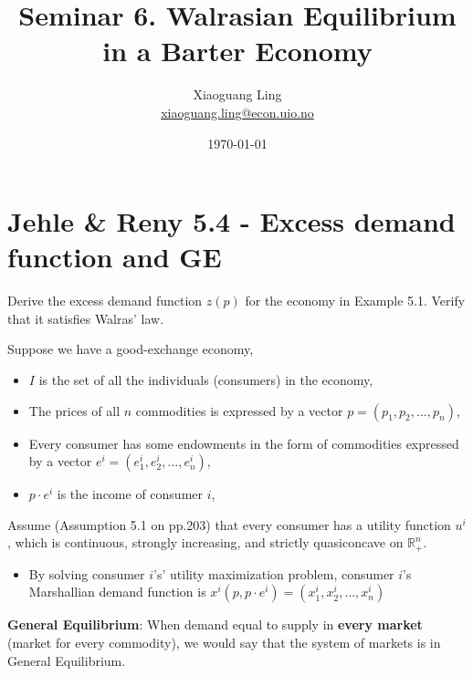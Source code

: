 \documentclass{article}
\title{Seminar 6. Walrasian Equilibrium in a Barter Economy}
\author{Xiaoguang Ling \\  \href{xiaoguang.ling@econ.uio.no}{xiaoguang.ling@econ.uio.no}}
\date{\today}
\newcommand{\R}{\mathbb{R}}
\begin{document}
\maketitle



\section{Jehle \& Reny 5.4 - Excess demand function and GE}

Derive the excess demand function $z(p)$ for the economy in Example 5.1. Verify that it satisfies
Walras' law.

\begin{mdframed}[backgroundcolor=blue!20,linecolor=white]

Suppose we have a good-exchange economy,

\begin{itemize}
\item $I$ is the set of all the individuals (consumers) in the economy,
\item The prices of all $n$ commodities is expressed by a vector $p = (p_1, p_2, \dots, p_n)$,
\item Every consumer has some endowments in the form of commodities expressed by a vector $e^i = (e^i_1,e^i_2,\dots,e^i_n)$,
\item $p\cdot e^i$ is the income of consumer $i$,
\end{itemize}

Assume (Assumption 5.1 on pp.203) that every consumer has a utility function $u^i$, which is continuous, strongly increasing, and strictly quasiconcave on $\R^n_{+}$.

\begin{itemize}
\item By solving consumer $i$'s' utility maximization problem, consumer $i$'s Marshallian demand function is $x^i(p,p\cdot e^i) = (x^i_1,x^i_2,\dots,x^i_n)$
\end{itemize}

\textbf{General Equilibrium}: When demand equal to supply in \textbf{every market} (market for every commodity), we would say that the system of markets is in General Equilibrium.

\vspace{2mm}


\end{mdframed}
\end{document}
